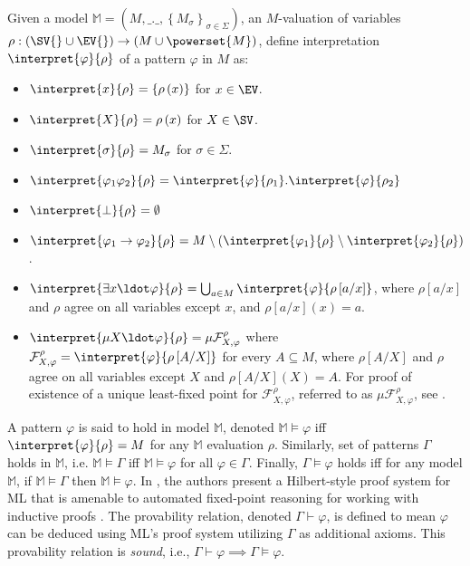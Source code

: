Given a model $\mathbb{M} = \left(M,\_.\_,\left\{M_{\sigma}\right\}_{\sigma \in
\Sigma}\right)$, an $M$-valuation of variables
$\rho:\left(\SV{}\cup\EV{}\right) \to \left(M \cup \powerset{M}\right)$, define
interpretation $\interpret{\varphi}{\rho}$ of a pattern $\varphi$ in $M$ as:
\begin{itemize}
  \item $\interpret{x}{\rho} = \left\{\rho\left(x\right)\right\}$ for $x \in \EV$.
  \item $\interpret{X}{\rho} = \rho\left(x\right)$ for $X \in \SV$.
  \item $\interpret{\sigma}{\rho} = M_{\sigma}$ for $\sigma \in \Sigma$.
  \item $\interpret{\varphi_1\varphi_2}{\rho} = \interpret{\varphi}{\rho_1} . \interpret{\varphi}{\rho_2}$
  \item $\interpret{\bot}{\rho} = \emptyset$
  \item $\interpret{\varphi_1 \to \varphi_2}{\rho} = M \setminus
    \left(\interpret{\varphi_1}{\rho} \setminus \interpret{\varphi_2}{\rho}\right)$.
  \item $\interpret{\exists x \ldot \varphi}{\rho} = \bigcup_{a \in
    M}\interpret{\varphi}{\rho\left[a / x\right]}$, where $\rho\left[a /
    x\right]$ and $\rho$ agree on all variables except $x$, and $\rho\left[a /
    x\right](x) = a$.
  \item $\interpret{\mu X \ldot \varphi}{\rho} =
    \mu\mathcal{F}^{\rho}_{X,\varphi}$ where $\mathcal{F}^{\rho}_{X,\varphi} =
    \interpret{\varphi}{\rho\left[A / X\right]}$ for every $A \subseteq M$,
    where $\rho\left[A / X\right]$ and $\rho$ agree on all variables except $X$
    and $\rho\left[A / X\right](X) = A$.  For proof of existence of a unique least-fixed point
    for $\mathcal{F}^{\rho}_{X,\varphi}$, referred to as $\mu\mathcal{F}^{\rho}_{X,\varphi}$, see \cite{ChenLICS19}.
\end{itemize}

A pattern $\varphi$ is said to hold in model $\mathbb{M}$, denoted $\mathbb{M} \vDash \varphi$ iff
$\interpret{\varphi}{\rho} = M$ for any $\mathbb{M}$ evaluation $\rho$. Similarly,
set of patterns $\Gamma$ holds in $\mathbb{M}$, i.e. $\mathbb{M} \vDash \Gamma$
iff $\mathbb{M} \vDash \varphi$ for all $\varphi \in \Gamma$.
Finally, $\Gamma \vDash \varphi$ holds iff for any model $\mathbb{M}$,
if $\mathbb{M} \vDash \Gamma$ then $\mathbb{M} \vDash \varphi$.
In \cite{ChenTR19}, the authors present a Hilbert-style proof system
for ML that is amenable to automated fixed-point reasoning for working with
inductive proofs \cite{ChenOOPSLA20}. The provability relation, denoted
$\Gamma \vdash \varphi$, is defined to mean $\varphi$ can be deduced using
ML's proof system utilizing $\Gamma$ as additional axioms. This
provability relation is \emph{sound}, i.e., $\Gamma \vdash \varphi \implies \Gamma
\vDash \varphi$.

